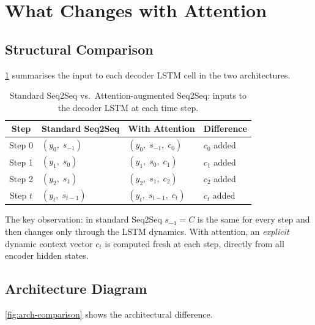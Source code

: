 \documentclass[12pt,a4paper]{article}
\begin{document}
\section{What Changes with Attention}
\label{sec:what-changes}

\subsection{Structural Comparison}

\cref{tab:comparison} summarises the input to each decoder LSTM cell
in the two architectures.

\begin{table}[ht]
\centering
\caption{Standard Seq2Seq vs.\ Attention-augmented Seq2Seq: inputs
         to the decoder LSTM at each time step.}
\label{tab:comparison}
\begin{tabular}{@{}clll@{}}
\toprule
\textbf{Step} & \textbf{Standard Seq2Seq} & \textbf{With Attention} & \textbf{Difference} \\
\midrule
Step 0 & $(y_0,\; s_{-1})$      & $(y_0,\; s_{-1},\; c_0)$ & $c_0$ added \\
Step 1 & $(y_1,\; s_0)$         & $(y_1,\; s_0,\;   c_1)$  & $c_1$ added \\
Step 2 & $(y_2,\; s_1)$         & $(y_2,\; s_1,\;   c_2)$  & $c_2$ added \\
Step $t$ & $(y_t,\; s_{t-1})$   & $(y_t,\; s_{t-1},\; c_t)$ & $c_t$ added \\
\bottomrule
\end{tabular}
\end{table}

The key observation: in standard Seq2Seq $s_{-1} = C$ is the same
for every step and then changes only through the LSTM dynamics.  With
attention, an \emph{explicit} dynamic context vector $c_t$ is
computed fresh at each step, directly from all encoder hidden states.

\subsection{Architecture Diagram}

\cref{fig:arch-comparison} shows the architectural difference.
\end{document}
